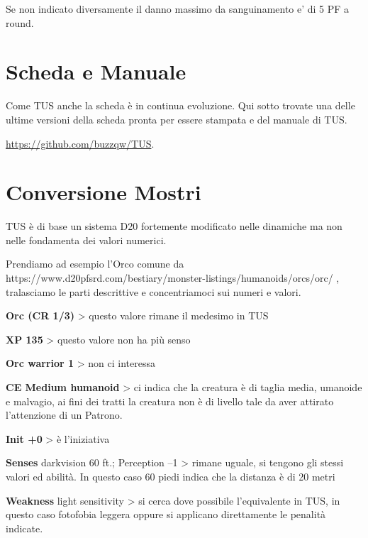 \documentclass[a4paper,11pt,twoside,openany]{book}
\begin{document}
Se non indicato diversamente il danno massimo da sanguinamento e' di 5 PF a round.

\pagebreak

\section{Scheda e Manuale}

\label{scheda-e-manuale}

Come TUS anche la scheda è in continua evoluzione. Qui sotto trovate una delle ultime versioni della scheda pronta per essere stampata e del manuale di TUS.

\url{https://github.com/buzzqw/TUS}.





\pagebreak

\section*{Conversione Mostri}

\bigskip

TUS è di base un sistema D20 fortemente modificato nelle dinamiche ma non nelle fondamenta dei valori numerici.

Prendiamo ad esempio l'Orco comune da https://www.d20pfsrd.com/bestiary/monster-listings/humanoids/orcs/orc/ , tralasciamo le parti descrittive e concentriamoci sui numeri e valori.

\bigskip

\textbf{Orc (CR 1/3)} \textgreater{} questo valore rimane il medesimo in TUS

\textbf{XP 135} \textgreater{} questo valore non ha più senso

\textbf{Orc warrior 1} \textgreater{} non ci interessa

\textbf{CE Medium humanoid} \textgreater{} ci indica che la creatura è di taglia media, umanoide e malvagio, ai fini dei tratti la creatura non è di livello tale da aver attirato l'attenzione di un Patrono.

\textbf{Init +0} \textgreater{} è l'iniziativa

\textbf{Senses} darkvision 60 ft.; Perception --1 \textgreater{} rimane uguale, si tengono gli stessi valori ed abilità. In questo caso 60 piedi indica che la distanza è di 20 metri

\textbf{Weakness} light sensitivity \textgreater{} si cerca dove possibile l'equivalente in TUS, in questo caso fotofobia leggera oppure si applicano direttamente le penalità indicate.
\end{document}
